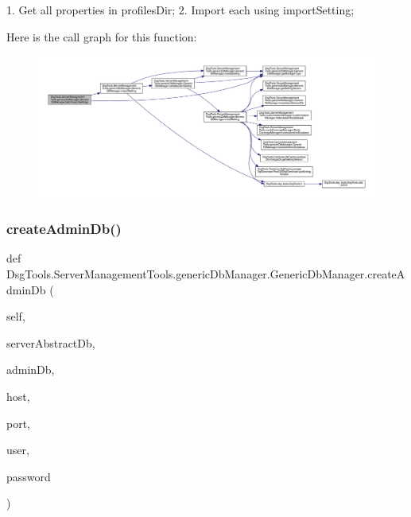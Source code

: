 \begin{DoxyVerb}1. Get all properties in profilesDir;
2. Import each using importSetting;
\end{DoxyVerb}
 Here is the call graph for this function\+:
\nopagebreak
\begin{figure}[H]
\begin{center}
\leavevmode
\includegraphics[width=350pt]{class_dsg_tools_1_1_server_management_tools_1_1generic_db_manager_1_1_generic_db_manager_aa7249fe469bbc7c88dc94c83100d682b_cgraph}
\end{center}
\end{figure}
\mbox{\label{class_dsg_tools_1_1_server_management_tools_1_1generic_db_manager_1_1_generic_db_manager_ab580a3306767739723fe615dba913d00}} 
\subsubsection{\texorpdfstring{create\+Admin\+Db()}{createAdminDb()}}
{\footnotesize\ttfamily def Dsg\+Tools.\+Server\+Management\+Tools.\+generic\+Db\+Manager.\+Generic\+Db\+Manager.\+create\+Admin\+Db (\begin{DoxyParamCaption}\item[{}]{self,  }\item[{}]{server\+Abstract\+Db,  }\item[{}]{admin\+Db,  }\item[{}]{host,  }\item[{}]{port,  }\item[{}]{user,  }\item[{}]{password }\end{DoxyParamCaption})}

